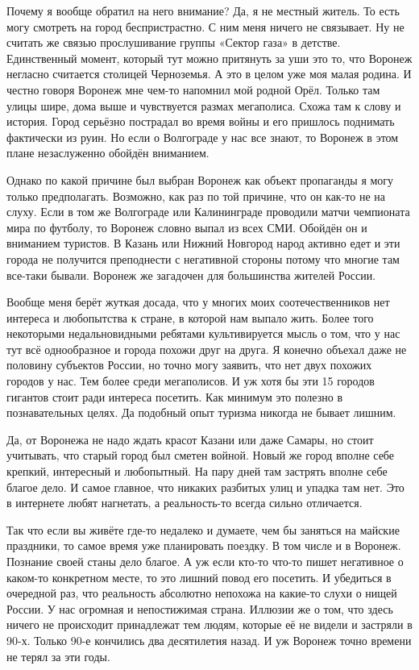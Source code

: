 Почему я вообще обратил на него внимание? Да, я не местный житель. То есть могу
смотреть на город беспристрастно. С ним меня ничего не связывает. Ну не считать
же связью прослушивание группы «Сектор газа» в детстве. Единственный момент,
который тут можно притянуть за уши это то, что Воронеж негласно считается
столицей Черноземья. А это в целом уже моя малая родина. И честно говоря
Воронеж мне чем-то напомнил мой родной Орёл. Только там улицы шире, дома выше и
чувствуется размах мегаполиса. Схожа там к слову и история. Город серьёзно
пострадал во время войны и его пришлось поднимать фактически из руин. Но если о
Волгограде у нас все знают, то Воронеж в этом плане незаслуженно обойдён
вниманием.


Однако по какой причине был выбран Воронеж как объект пропаганды я могу только
предполагать. Возможно, как раз по той причине, что он как-то не на слуху. Если
в том же Волгограде или Калининграде проводили матчи чемпионата мира по
футболу, то Воронеж словно выпал из всех СМИ. Обойдён он и вниманием туристов.
В Казань или Нижний Новгород народ активно едет и эти города не получится
преподнести с негативной стороны потому что многие там все-таки бывали. Воронеж
же загадочен для большинства жителей России.

Вообще меня берёт жуткая досада, что у многих моих соотечественников нет
интереса и любопытства к стране, в которой нам выпало жить. Более того
некоторыми недальновидными ребятами культивируется мысль о том, что у нас тут
всё однообразное и города похожи друг на друга. Я конечно объехал даже не
половину субъектов России, но точно могу заявить, что нет двух похожих городов
у нас. Тем более среди мегаполисов. И уж хотя бы эти 15 городов гигантов стоит
ради интереса посетить. Как минимум это полезно в познавательных целях. Да
подобный опыт туризма никогда не бывает лишним.

Да, от Воронежа не надо ждать красот Казани или даже Самары, но стоит
учитывать, что старый город был сметен войной. Новый же город вполне себе
крепкий, интересный и любопытный. На пару дней там застрять вполне себе благое
дело. И самое главное, что никаких разбитых улиц и упадка там нет. Это в
интернете любят нагнетать, а реальность-то всегда сильно отличается.

Так что если вы живёте где-то недалеко и думаете, чем бы заняться на майские
праздники, то самое время уже планировать поездку. В том числе и в Воронеж.
Познание своей станы дело благое. А уж если кто-то что-то пишет негативное о
каком-то конкретном месте, то это лишний повод его посетить. И убедиться в
очередной раз, что реальность абсолютно непохожа на какие-то слухи о нищей
России. У нас огромная и непостижимая страна. Иллюзии же о том, что здесь
ничего не происходит принадлежат тем людям, которые её не видели и застряли в
90-х. Только 90-е кончились два десятилетия назад. И уж Воронеж точно времени
не терял за эти годы.

